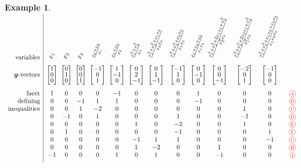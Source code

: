 \documentclass{amsart}
\theoremstyle{definition}
\newtheorem{example}[theorem]{Example}
\renewcommand{\b}[1]{{\boldsymbol{#1}}} %
\newcommand{\red}{\color{red}} %
\newcommand*\circled[1]{\tikz[baseline=(char.base)]{\node[shape=circle, draw, inner sep=1.5pt, scale=.7] (char) {#1};}}
\newcommand{\compactVectorT}[3]{\begin{bmatrix} #1 \\[-.1cm] #2 \\[-.1cm] #3 \end{bmatrix}}
\begin{document}
\begin{example}
\centerline{$
\begin{array}{r|c@{\;\;}c@{\;\;}c@{\;\;}c@{\;\;}c@{\;\;}c@{\;}c@{\;}c@{\;}c@{}c@{}c@{}cc}
\text{variables} & \rotatebox{70}{$x_1$} & \rotatebox{70}{$x_2$} & \rotatebox{70}{$x_3$} & \rotatebox{70}{$\frac{x_2 + x_3}{x_1}$} & \rotatebox{70}{$\frac{x_1 + x_3}{x_2}$} & \rotatebox{70}{$\frac{x_1^2 + x_2^2}{x_3}$} & \rotatebox{70}{$\frac{x_1^2 + x_2^2 + x_1 x_3}{x_2 x_3}$} & \rotatebox{70}{$\frac{x_1^2 + x_2^2 + x_2 x_3}{x_1 x_3}$} & \rotatebox{70}{$\frac{x_1 + x_2 + x_3}{x_1 x_2}$} & \rotatebox{70}{$\frac{x_1^2 + x_2^2 + 2 x_1 x_3 + x_3^2}{x_2^2 x_3}$} & \rotatebox{70}{$\frac{x_1^2 + x_2^2 + 2 x_2 x_3 + x_3^2}{x_1^2 x_3}$} & \rotatebox{70}{$\frac{x_1^2 + x_2^2 + x_1 x_3 + x_2 x_3}{x_1 x_2 x_3}$} \\[.2cm]
\text{$\b{g}$-vectors} & \compactVectorT{1}{0}{0} & \compactVectorT{0}{1}{0} & \compactVectorT{0}{0}{1} & \compactVectorT{-1}{0}{1} & \compactVectorT{1}{-1}{0} & \compactVectorT{0}{2}{-1} & \compactVectorT{0}{1}{-1} & \compactVectorT{-1}{1}{0} & \compactVectorT{0}{-1}{0} & \compactVectorT{0}{0}{-1} & \compactVectorT{-2}{0}{1} & \compactVectorT{-1}{0}{0}  \\[.6cm]
\text{facet}		& 1 & 0 & 0 & 0 & -1 & 0 & 0 & 0 & 1 & 0 & 0 & 0 & \red \circled{A} \\
\text{defining}		& 0 & 0 & -1 & 1 & 1 & 0 & 0 & 0 & -1 & 0 & 0 & 0 & \red \circled{B} \\
\text{inequalities}	& 0 & 0 & 1 & -2 & 0 & 0 & 0 & 0 & 0 & 0 & 1 & 0 & \red \circled{C} \\
					& 0 & -1 & 0 & 1 & 0 & 0 & 0 & 1 & 0 & 0 & -1 & 0 & \red \circled{D} \\
					& 0 & 0 & 0 & 0 & 0 & 1 & 0 & -2 & 0 & 0 & 1 & 0 & \red \circled{E} \\
					& 0 & 1 & 0 & 0 & 0 & 0 & 0 & -1 & 0 & 0 & 0 & 1 & \red \circled{F} \\
					& 0 & 0 & 0 & 0 & 0 & -1 & 1 & 1 & 0 & 0 & 0 & -1 & \red \circled{G} \\
					& 0 & 0 & 0 & 0 & 0 & 1 & -2 & 0 & 0 & 1 & 0 & 0 & \red \circled{H} \\
					& -1 & 0 & 0 & 0 & 1 & 0 & 1 & 0 & 0 & -1 & 0 & 0 & \red \circled{I} \\[.2cm]
\end{array}
$}




\end{example}
\end{document}
